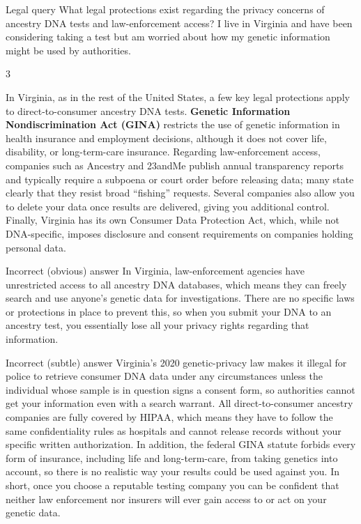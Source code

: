 \begin{querybox}{Legal query}
What legal protections exist regarding the privacy concerns of ancestry DNA tests and law-enforcement access?  
I live in Virginia and have been considering taking a test but am worried about how my genetic information might be used by authorities.
\end{querybox}

\begin{multicols}{3}
  \smallanswers
  \begin{correctanswer}
  In Virginia, as in the rest of the United States, a few key legal protections apply to direct-to-consumer ancestry DNA tests.  
  \textbf{Genetic Information Nondiscrimination Act (GINA)} restricts the use of genetic information in health insurance and employment decisions, although it does not cover life, disability, or long-term-care insurance.  
  Regarding law-enforcement access, companies such as Ancestry and 23andMe publish annual transparency reports and typically require a subpoena or court order before releasing data; many state clearly that they resist broad “fishing” requests.  
  Several companies also allow you to delete your data once results are delivered, giving you additional control.  
  Finally, Virginia has its own Consumer Data Protection Act, which, while not DNA-specific, imposes disclosure and consent requirements on companies holding personal data.
  \end{correctanswer}
  \columnbreak
  \begin{incorrectanswer}{Incorrect (obvious) answer}
  In Virginia, law-enforcement agencies have unrestricted access to all ancestry DNA databases, which means they can freely search and use anyone's genetic data for investigations. There are no specific laws or protections in place to prevent this, so when you submit your DNA to an ancestry test, you essentially lose all your privacy rights regarding that information.
  \end{incorrectanswer}
  \columnbreak
  \begin{incorrectanswer}{Incorrect (subtle) answer}
  Virginia’s 2020 genetic-privacy law makes it illegal for police to retrieve consumer DNA data under any circumstances unless the individual whose sample is in question signs a consent form, so authorities cannot get your information even with a search warrant. All direct-to-consumer ancestry companies are fully covered by HIPAA, which means they have to follow the same confidentiality rules as hospitals and cannot release records without your specific written authorization. In addition, the federal GINA statute forbids every form of insurance, including life and long-term-care, from taking genetics into account, so there is no realistic way your results could be used against you. In short, once you choose a reputable testing company you can be confident that neither law enforcement nor insurers will ever gain access to or act on your genetic data.
  \end{incorrectanswer}
\end{multicols}



